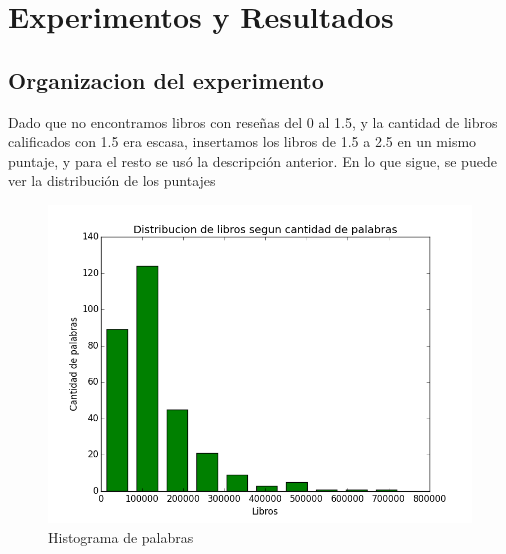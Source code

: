 \documentclass[12pt,journal,compsoc]{IEEEtran}
\begin{document}
\section{Experimentos y Resultados}

\subsection{Organizacion del experimento}
Dado que no encontramos libros con reseñas del 0 al 1.5, y la cantidad de libros calificados con 1.5 era escasa, insertamos los libros de 1.5 a 2.5 en un mismo puntaje, y para el resto se usó la descripción anterior.
En lo que sigue, se puede ver la distribución de los puntajes 


\begin{figure}[H]
\begin{center}
  \includegraphics[width=6.0in]{../unigrams/scripts/histogram/histogramaDePalabras.png}
  \caption{Histograma de palabras}
  \end{center}
\end{figure}
\end{document}
